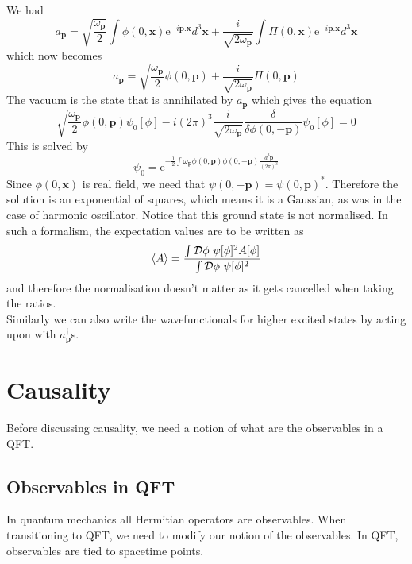 \documentclass[11pt, notitlepage]{report}
\newcommand{\e}{\mathrm{e}}
\newcommand{\w}{\omega}
\newcommand{\D}{\mathcal{D}}
\numberwithin{equation}{section}
\begin{document}
    We had 
    \begin{equation}
        a_\textbf{p} = \sqrt{\frac{\w_\textbf{p}}{2}}\int\phi(0, \textbf{x}) \e^{-i \textbf{p}. \textbf{x}}d^3\textbf{x} + \frac{i}{\sqrt{2\w_\textbf{p}}}\int \Pi(0, \textbf{x})\e^{-i \textbf{p}.\textbf{x}} d^3\textbf{x} 
    \end{equation}
    which now becomes 
    \begin{equation}
        a_\textbf{p} = \sqrt{\frac{\w_\textbf{p}}{2}}\phi(0, \textbf{p}) + \frac{i}{\sqrt{2\w_\textbf{p}}}\Pi(0,\textbf{p})
    \end{equation}
    The vacuum is the state that is annihilated by \(a_\textbf{p}\) which gives the equation
    \begin{equation}
        \sqrt{\frac{\w_\textbf{p}}{2}}\phi(0, \textbf{p}) \psi_0[\phi] -i(2\pi)^3 \frac{i}{\sqrt{2\w_\textbf{p}}}\frac{\delta}{\delta \phi(0, -\textbf{p})}\psi_0[\phi] = 0
    \end{equation}
    This is solved by 
    \begin{equation}
        \psi_0 = \displaystyle\e^{-\frac{1}{2}\int \w_\textbf{p} \phi(0, \textbf{p})\phi(0, -\textbf{p})\frac{d^3\textbf{p}}{(2\pi)^3}}
    \end{equation}
    Since \(\phi(0, \textbf{x})\) is real field, we need that \(\psi(0, -\textbf{p}) = \psi(0, \textbf{p})^*\). Therefore the solution is an exponential of squares, which means it is a Gaussian, as was in the case of harmonic oscillator. Notice that this ground state is not normalised. In such a formalism, the expectation values are to be written as 
    \begin{equation}
        \braket{A} = \displaystyle \frac{\int \D \phi ~ \psi[\phi]^2 A[\phi] }{\int \D \phi ~ \psi[\phi]^2}
    \end{equation}
    and therefore the normalisation doesn't matter as it gets cancelled when taking the ratios.\\

    Similarly we can also write the wavefunctionals for higher excited states by acting upon with \(a^\dagger_\textbf{p}\)s.

    \newpage
    \section{Causality}
    Before discussing causality, we need a notion of what are the observables in a QFT. 

    \subsection{Observables in QFT}
    In quantum mechanics all Hermitian operators are observables. When transitioning to QFT, we need to modify our notion of the observables. In QFT, observables are tied to spacetime points.\\
\end{document}
